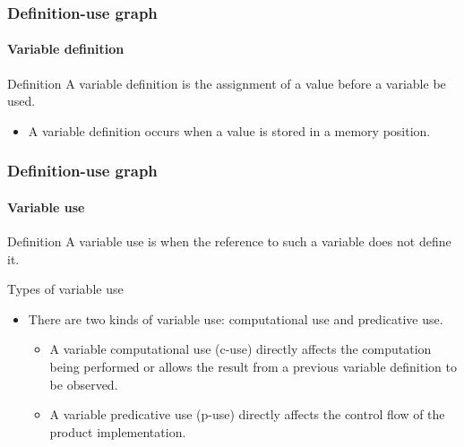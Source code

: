 \begin{frame}
\frametitle{Definition-use graph}
\framesubtitle{Variable definition}
\label{concept:variable-definition}

\begin{block:concept}{Definition}
A variable definition is the assignment of a value before a variable be used.
\begin{itemize}
	\item A variable definition occurs when a value is stored in a memory
	position.
\end{itemize}
\end{block:concept}
\end{frame}


\begin{frame}
\frametitle{Definition-use graph}
\framesubtitle{Variable use}
\label{concept:variable-use}

\begin{block:concept}{Definition}
A variable use is when the reference to such a variable does not
define it.
\end{block:concept}

\begin{block:fact}{Types of variable use}
\begin{itemize}
	\item There are two kinds of variable use: computational use and
	predicative use.
	\begin{itemize}
		\item A variable computational use (c-use) directly affects the
		computation being performed or allows the result from a previous
		variable definition to be observed.

		\item A variable predicative use (p-use) directly affects the control
		flow of the product implementation.
	\end{itemize}
\end{itemize}
\end{block:fact}
\end{frame}



